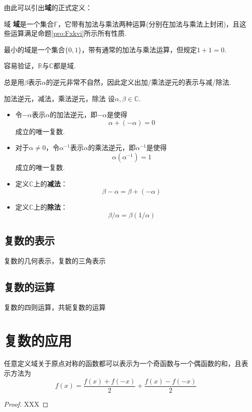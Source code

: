 \documentclass[lang=cn, zihao=4.5]{elegantbook}
\newcommand{\R}{\mathbb{R}}
\newcommand{\C}{\mathbb{C}}
\newcommand{\F}{\mathbb{F}}
\begin{document}
由此可以引出\textbf{域}的正式定义：

\begin{definition}{域}
	\textbf{域}是一个集合$\F$，它带有加法与乘法两种运算(分别在加法与乘法上封闭)，且这些运算满足命题\ref{pro:Fxkvi}所示所有性质.
\end{definition}
\begin{remark}
	最小的域是一个集合$\{ 0,1 \}$，带有通常的加法与乘法运算，但规定$1+1=0$.
\end{remark}

容易验证，$\R$与$\C$都是域.

总是用$\beta$表示$\alpha$的逆元非常不自然，因此定义出加/乘法逆元的表示与减/除法.

\begin{definition}{加法逆元，减法，乘法逆元，除法}
	设$\alpha , \beta \in \C $.
	\begin{itemize}
		\item 令$- \alpha$表示$\alpha$的加法逆元，即$-\alpha$是使得$$\alpha + (-\alpha) = 0$$成立的唯一复数.
		\item 对于$\alpha \neq 0$，令$\alpha ^{-1}$表示$\alpha$的乘法逆元，即$\alpha ^{-1}$是使得$$\alpha (\alpha ^{-1}) = 1$$成立的唯一复数.
		\item 定义$\C $上的\textbf{减法}：$$\beta - \alpha = \beta + (-\alpha)$$
		\item 定义$\C $上的\textbf{除法}：$$\beta / \alpha = \beta (1 / \alpha)$$
	\end{itemize}
\end{definition}

\subsection{复数的表示}

复数的几何表示，复数的三角表示

\subsection{复数的运算}

复数的四则运算，共轭复数的运算

\section{复数的应用}

\begin{lemma}
    任意定义域关于原点对称的函数都可以表示为一个奇函数与一个偶函数的和，且表示方法为$$f(x)=\frac{f(x)+f(-x)}{2}+\frac{f(x)-f(-x)}{2}$$
\end{lemma}
\begin{proof}
    XXX
\end{proof}
\end{document}
